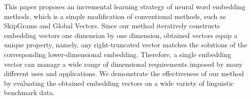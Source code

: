 This paper proposes an incremental learning strategy of neural word embedding methods, which is a simple modification of conventional methods, such as SkipGrams and Global Vectors. Since our method iteratively constructs embedding vectors one dimension by one dimension, obtained vectors equip a unique property, namely, any right-truncated vector matches the solutions of the corresponding lower-dimensional embedding. Therefore, a single embedding vector can manage a wide range of dimensional requirements imposed by many different uses and applications. We demonstrate the effectiveness of our method by evaluating the obtained embedding vectors on a wide variety of linguistic benchmark data.
